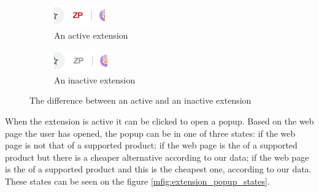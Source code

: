\documentclass[12pt,a4paper,twoside]{report}
\begin{document}
\begin{figure}[ht]
  \centering
  \begin{subfigure}{0.4\textwidth}
    \centering
    \includegraphics[width=0.5\linewidth]{img/active_extension_icon.png}
    \caption[]{An active extension}
    \label{fig:users_guide_active_extension}
  \end{subfigure}
  \begin{subfigure}{0.4\textwidth}
    \centering
    \includegraphics[width=0.5\linewidth]{img/inactive_extension_icon.png}
    \caption[]{An inactive extension}
    \label{fig:users_guide_inactive_extension}
  \end{subfigure}
  \caption{The difference between an active and an inactive extension}
  \label{mfig:users_guide_active_and_inactive_extension}
\end{figure}

When the extension is active it can be clicked to open a popup. Based on the web page the user has opened, the popup can be in one of three states: if the web page is not that of a supported product; if the web page is the of a supported product but there is a cheaper alternative according to our data; if the web page is the of a supported product and this is the cheapest one, according to our data. These states can be seen on the figure \ref{mfig:extension_popup_states}.
\end{document}
